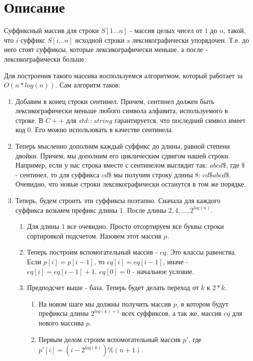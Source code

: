 \section{Описание}

Суффиксный массив для строки $S[1...n]$ - массив целых чисел от $1$ до $n$, такой, что $i$ суффикс $S[i...n]$ исходной строки $s$ лексикографически упорядочен. Т.е. до него стоят суффиксы, которые лексикографически меньше, а после - лексикографически больше. 

Для построения такого массива воспользуемся алгоритмом, который работает за $O(n * log(n))$. Сам алгоритм таков:

\begin{enumerate} 
  \item  Добавим в конец строки сентинел. Причем, сентинел должен быть лексикографически меньше любого символа алфавита, используемого в строке. В $C++$ для $std::string$ гарантируется, что последний символ имеет код $0$. Его можно использовать в качестве сентинела.
  \item  Теперь мысленно дополним каждый суффикс до длины, равной степени двойки. Причем, мы дополним его циклическим сдвигом нашей строки. Например, если у нас строка вместе с сентинелом выглядит так: $abcd\$$, где $\$$ - сентинел, то для суффикса $cd\$$ мы получим строку длины $8$: $cd\$abcd\$$. Очевидно, что новые строки лексикографически останутся в том же порядке.
  \item Теперь, будем строить эти суффиксы поэтапно. Сначала для каждого суффикса возьмем префикс длины $1$. После длины $2, 4, ..., 2 ^ {log(n)}$.
    \begin{enumerate}
        \item Для длины $1$ все очевидно. Просто отсортируем все буквы строки сортировкой подсчетом. Назовем этот массив $p$.
        \item Теперь построим вспомогательный массив - $eq$. Это классы равенства. Если $p[i] = p[i - 1]$, то $eq[i] = eq[i - 1]$, иначе - $eq[i] = eq[i - 1] + 1$. $eq[0] = 0$ - начальное условие.
        \item Предподсчет выше - база. Теперь будет делать переход от $k$ к $2 * k$.
        \begin{enumerate}
            \item На новом шаге мы должны получить массив $p$, в котором будут префиксы длины $2 ^ {log(k) + 1}$ всех суффиксов, а так же, массив $eq$ для нового массива $p$.
            \item Первым делом строим вспомогательный массив $p'$, где $p'[i] = (i - 2 ^ {log(k)}) \% (n + 1)$.

\end{enumerate}
\end{enumerate}
\end{enumerate}
